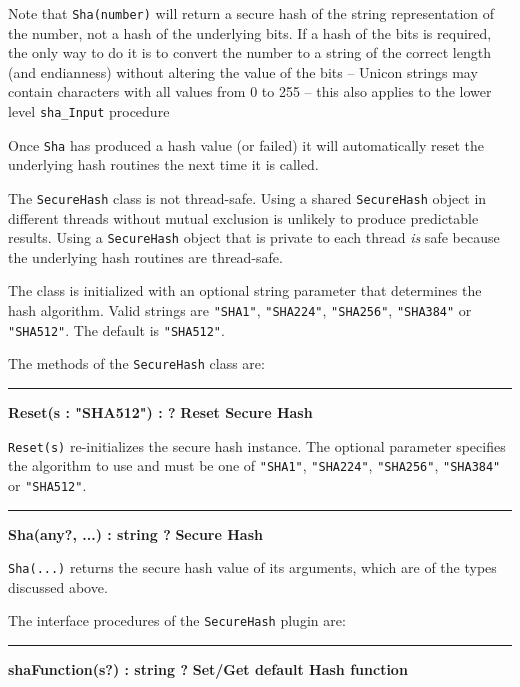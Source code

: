 Note that \texttt{Sha(number)} will return a secure hash of the string
representation of the number, not a hash of the underlying bits. If a hash of
the bits is required, the only way to do it is to convert the number to a string
of the correct length (and endianness) without altering the value of the bits
-- Unicon strings may contain characters with all values from 0 to 255 -- this
also applies to the lower level \texttt{sha\_Input} procedure

Once \texttt{Sha} has produced a hash value (or failed) it will automatically
reset the underlying hash routines the next time it is called.

The \texttt{SecureHash} class is not thread-safe. \WarningNotThreadSafe
Using a shared \texttt{SecureHash} object in different threads without mutual
exclusion is unlikely to produce predictable results. Using a
\texttt{SecureHash} object that is private to each thread {\em is\/} safe
because the underlying hash routines are thread-safe.

The class is initialized with an optional string parameter that determines the
hash algorithm. Valid strings are \texttt{"SHA1"}, \texttt{"SHA224"},
\texttt{"SHA256"}, \texttt{"SHA384"} or \texttt{"SHA512"}.  The default is
\texttt{"SHA512"}.


The methods of the \texttt{SecureHash} class are:

\bigskip\hrule\vspace{0.1cm}
\noindent
{\bf Reset(s : "SHA512") : ? } \hfill {\bf Reset Secure Hash}

\noindent
{}\texttt{Reset(s)} re-initializes the secure hash instance.  The
optional parameter specifies the algorithm to use and must be one of \texttt{"SHA1"},
\texttt{"SHA224"}, \texttt{"SHA256"}, \texttt{"SHA384"} or \texttt{"SHA512"}.

\bigskip\hrule\vspace{0.1cm}
\noindent
{\bf Sha(any?, ...) : string ? } \hfill {\bf Secure Hash}

\noindent
{}\texttt{Sha(...)} returns the secure hash value of its
arguments, which are of the types discussed above.

\bigskip
The interface procedures of the \texttt{SecureHash} plugin are:

\bigskip\hrule\vspace{0.1cm}
\noindent
{\bf shaFunction(s?) : string ? } \hfill {\bf Set/Get default Hash function}

